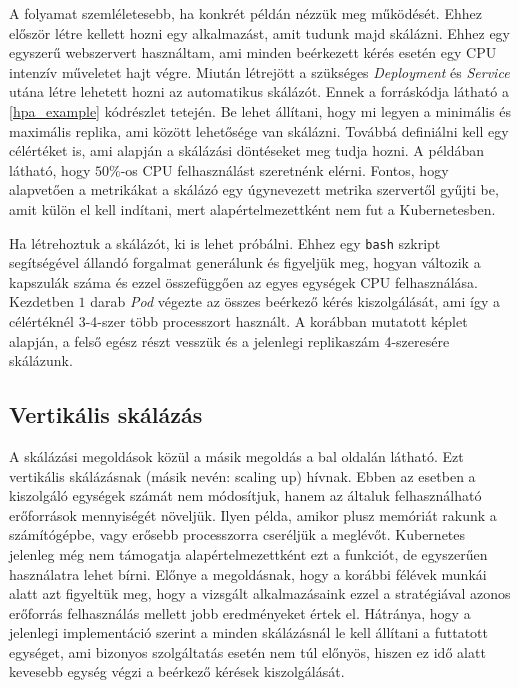 A folyamat szemléletesebb, ha konkrét példán nézzük meg működését.
Ehhez először létre kellett hozni egy alkalmazást, amit tudunk majd skálázni.
Ehhez egy egyszerű webszervert használtam, ami minden beérkezett kérés esetén egy CPU intenzív műveletet hajt végre. 
Miután létrejött a szükséges \textit{Deployment} és \textit{Service} utána létre lehetett hozni az automatikus skálázót.
Ennek a forráskódja látható a \ref{hpa_example} kódrészlet tetején.
Be lehet állítani, hogy mi legyen a minimális és maximális replika, ami között lehetősége van skálázni. 
Továbbá definiálni kell egy célértéket is, ami alapján a skálázási döntéseket meg tudja hozni.
A példában látható, hogy $50\%$-os CPU felhasználást szeretnénk elérni.
Fontos, hogy alapvetően a metrikákat a skálázó egy úgynevezett metrika szervertől gyűjti be, amit külön el kell indítani, mert alapértelmezettként nem fut a Kubernetesben.

Ha létrehoztuk a skálázót, ki is lehet próbálni.
Ehhez egy \verb+bash+ szkript segítségével állandó forgalmat generálunk és figyeljük meg, hogyan változik a kapszulák száma és ezzel összefüggően az egyes egységek CPU felhasználása.
Kezdetben $1$ darab \textit{Pod} végezte az összes beérkező kérés kiszolgálását, ami így a célértéknél 3-4-szer több processzort használt.
A korábban mutatott képlet alapján, a felső egész részt vesszük és a jelenlegi replikaszám 4-szeresére skálázunk. \\
 
\lstset{caption=Automatikus horizontális skálázás folyamata, label=hpa_example}



\subsection{Vertikális skálázás}
A skálázási megoldások közül a másik megoldás a  bal oldalán látható. 
Ezt vertikális skálázásnak (másik nevén: scaling up) hívnak. 
Ebben az esetben a kiszolgáló egységek számát nem módosítjuk, hanem az általuk felhasználható
erőforrások mennyiségét növeljük. Ilyen példa, amikor plusz memóriát rakunk a számítógépbe, vagy
erősebb processzorra cseréljük a meglévőt. Kubernetes jelenleg még nem támogatja alapértelmezettként
ezt a funkciót, de egyszerűen használatra lehet bírni. Előnye a megoldásnak, hogy a korábbi félévek
munkái alatt azt figyeltük meg, hogy a vizsgált alkalmazásaink ezzel a stratégiával azonos erőforrás
felhasználás mellett jobb eredményeket értek el.\citep{bscThesis} Hátránya, hogy a jelenlegi
implementáció szerint a minden skálázásnál le kell állítani a futtatott egységet, ami bizonyos
szolgáltatás esetén nem túl előnyös, hiszen ez idő alatt kevesebb egység végzi a beérkező kérések kiszolgálását.

